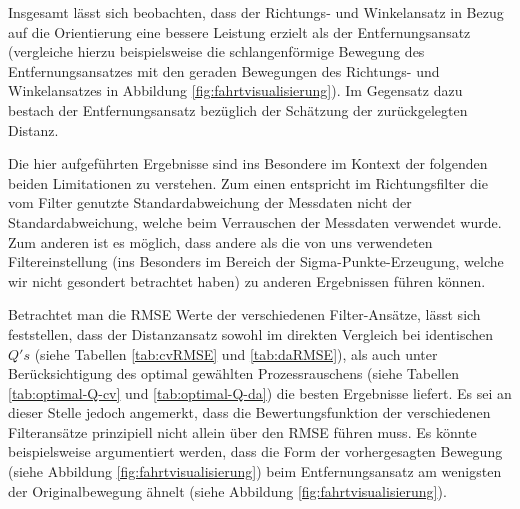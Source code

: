 \documentclass[conference]{IEEEtran}[10pt]
\begin{document}
Insgesamt lässt sich beobachten, dass der Richtungs- und Winkelansatz in Bezug auf die Orientierung eine bessere Leistung erzielt als der Entfernungsansatz (vergleiche hierzu beispielsweise die schlangenförmige Bewegung des Entfernungsansatzes mit den geraden Bewegungen des Richtungs- und Winkelansatzes in Abbildung \ref{fig:fahrtvisualisierung}).
Im Gegensatz dazu bestach der Entfernungsansatz bezüglich der Schätzung der zurückgelegten Distanz.




Die hier aufgeführten Ergebnisse sind ins Besondere im Kontext der folgenden beiden Limitationen zu verstehen. Zum einen entspricht im Richtungsfilter die vom Filter genutzte Standardabweichung der Messdaten nicht der Standardabweichung, welche beim Verrauschen der Messdaten verwendet wurde. %
Zum anderen ist es möglich, dass andere als die von uns verwendeten Filtereinstellung (ins Besonders im Bereich der Sigma-Punkte-Erzeugung, welche wir nicht gesondert betrachtet haben) zu anderen Ergebnissen führen können.

Betrachtet man die RMSE Werte der verschiedenen Filter-Ansätze, lässt sich feststellen, dass der Distanzansatz sowohl im direkten Vergleich bei identischen \(Q's\) (siehe Tabellen \ref{tab:cvRMSE} und \ref{tab:daRMSE}), als auch  unter Berücksichtigung des optimal gewählten Prozessrauschens (siehe Tabellen \ref{tab:optimal-Q-cv} und \ref{tab:optimal-Q-da}) die besten Ergebnisse liefert. 
Es sei an dieser Stelle jedoch angemerkt, dass die Bewertungsfunktion der verschiedenen Filteransätze prinzipiell nicht allein über den RMSE führen muss. Es könnte beispielsweise argumentiert werden, dass die Form der vorhergesagten Bewegung (siehe Abbildung \ref{fig:fahrtvisualisierung}) beim Entfernungsansatz am wenigsten der Originalbewegung ähnelt (siehe Abbildung \ref{fig:fahrtvisualisierung}). 
\end{document}
